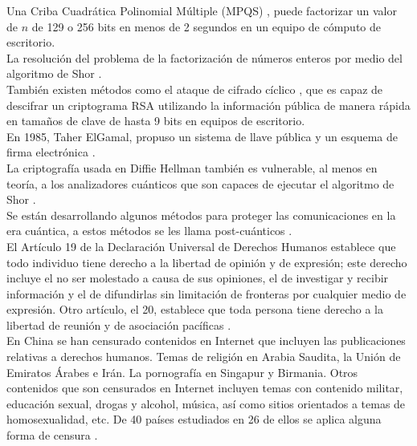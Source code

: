 \documentclass[10pt,letterpaper]{article}
\begin{document}
Una Criba Cuadrática Polinomial Múltiple (MPQS) \cite{silverman1987multiple}, puede factorizar un valor de $n$ de 129 o 256 bits en menos de 2 segundos en un equipo de cómputo de escritorio.\\

La resolución del problema de la factorización de números enteros por medio del algoritmo de Shor \cite{shor1994algorithms}.\\

También existen métodos como el ataque de cifrado cíclico \cite{hecht2014aportes}, que es capaz de descifrar un criptograma RSA utilizando la información pública de manera rápida en tamaños de clave de hasta 9 bits en equipos de escritorio.\\

En 1985, Taher ElGamal, propuso un sistema de llave pública y un esquema de firma electrónica \cite{elgamal1985public}.\\

La criptografía usada en Diffie Hellman también es vulnerable, al menos en teoría, a los analizadores cuánticos que son capaces de ejecutar el algoritmo de Shor \cite{shor1999polynomial}.\\

Se están desarrollando algunos métodos para proteger las comunicaciones en la era cuántica, a estos métodos se les llama post-cuánticos \cite{ding2005rainbow,bernstein2015sphincs,alkim2016post,overbeck2009code}.\\

El Artículo 19 de la Declaración Universal de Derechos Humanos establece que todo individuo tiene derecho a la libertad de opinión y de expresión; este derecho incluye el no ser molestado a causa de sus opiniones, el de investigar y recibir información y el de difundirlas sin limitación de fronteras por cualquier medio de expresión. Otro artículo, el 20, establece que toda persona tiene derecho a la libertad de reunión y de asociación pacíficas \cite{de2003declaracion}.\\

En China se han censurado contenidos en Internet que incluyen las publicaciones relativas a derechos humanos. Temas de religión en Arabia Saudita, la Unión de Emiratos Árabes e Irán. La pornografía en Singapur y Birmania. Otros contenidos que son censurados en Internet incluyen temas con contenido militar, educación sexual, drogas y alcohol, música, así como sitios orientados a temas de homosexualidad, etc. De 40 países estudiados en 26 de ellos se aplica alguna forma de censura \cite{opennet2006opennet}.\\
\end{document}

